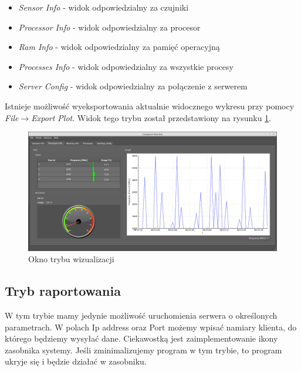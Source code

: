 \documentclass[a4paper]{article}
\begin{document}
\begin{itemize}
	\item \textit{Sensor Info} - widok odpowiedzialny za czujniki
	\item \textit{Processor Info} - widok odpowiedzialny za procesor
	\item \textit{Ram Info} - widok odpowiedzialny za pamięć operacyjną
	\item \textit{Processes Info} - widok odpowiedzialny za wszystkie procesy
	\item \textit{Server Config} - widok odpowiedzialny za połączenie z serwerem
\end{itemize}
Istnieje możliwość wyeksportowania aktualnie widocznego wykresu przy pomocy \textit{File}$\rightarrow$\textit{Export Plot}. Widok tego trybu został przedstawiony na rysunku \ref{okno_trybu_wizualizacji}.

\begin{figure}[H]
	\centering
	\includegraphics[height=0.25\paperheight]{img/oknoTrybuWizualizacji.png}
	\caption{Okno trybu wizualizacji}
	\label{okno_trybu_wizualizacji}
\end{figure}

\subsection{Tryb raportowania}
W tym trybie mamy jedynie możliwość uruchomienia serwera o określonych parametrach. W polach Ip address oraz Port możemy wpisać namiary klienta, do którego będziemy wysyłać dane. Ciekawostką jest zaimplementowanie ikony zasobnika systemy. Jeśli zminimalizujemy program w tym trybie, to program ukryje się i będzie działać w zasobniku.
\end{document}
